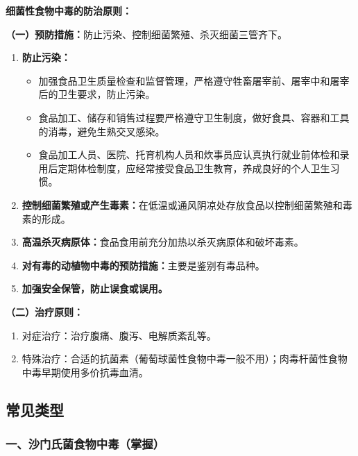 \begin{keybox}
\textbf{细菌性食物中毒的防治原则：}

\textbf{（一）预防措施：}防止污染、控制细菌繁殖、杀灭细菌三管齐下。
\begin{enumerate}[leftmargin=*]
    \item \textbf{防止污染：}
    \begin{itemize}
        \item 加强食品卫生质量检查和监督管理，严格遵守牲畜屠宰前、屠宰中和屠宰后的卫生要求，防止污染。
        \item 食品加工、储存和销售过程要严格遵守卫生制度，做好食具、容器和工具的消毒，避免生熟交叉感染。
        \item 食品加工人员、医院、托育机构人员和炊事员应认真执行就业前体检和录用后定期体检制度，应经常接受食品卫生教育，养成良好的个人卫生习惯。
    \end{itemize}
    \item \textbf{控制细菌繁殖或产生毒素：}在低温或通风阴凉处存放食品以控制细菌繁殖和毒素的形成。
    \item \textbf{高温杀灭病原体：}食品食用前充分加热以杀灭病原体和破坏毒素。
    \item \textbf{对有毒的动植物中毒的预防措施：}主要是鉴别有毒品种。
    \item \textbf{加强安全保管，防止误食或误用。}
\end{enumerate}

\textbf{（二）治疗原则：}
\begin{enumerate}[leftmargin=*]
    \item 对症治疗：治疗腹痛、腹泻、电解质紊乱等。
    \item 特殊治疗：合适的抗菌素（葡萄球菌性食物中毒一般不用）；肉毒杆菌性食物中毒早期使用多价抗毒血清。
\end{enumerate}
\end{keybox}

\subsection{常见类型}

\subsubsection{一、沙门氏菌食物中毒（掌握）}

